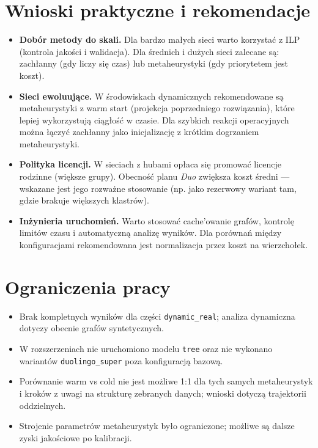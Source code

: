 \section{Wnioski praktyczne i rekomendacje}
\begin{itemize}
  \item \textbf{Dobór metody do skali.} Dla bardzo małych sieci warto korzystać z ILP (kontrola jakości i walidacja). Dla średnich i dużych sieci zalecane są: zachłanny (gdy liczy się czas) lub metaheurystyki (gdy priorytetem jest koszt).
  \item \textbf{Sieci ewoluujące.} W środowiskach dynamicznych rekomendowane są metaheurystyki z warm start (projekcja poprzedniego rozwiązania), które lepiej wykorzystują ciągłość w czasie. Dla szybkich reakcji operacyjnych można łączyć zachłanny jako inicjalizację z krótkim dogrzaniem metaheurystyki.
  \item \textbf{Polityka licencji.} W sieciach z hubami opłaca się promować licencje rodzinne (większe grupy). Obecność planu \emph{Duo} zwiększa koszt średni — wskazane jest jego rozważne stosowanie (np. jako rezerwowy wariant tam, gdzie brakuje większych klastrów).
  \item \textbf{Inżynieria uruchomień.} Warto stosować cache’owanie grafów, kontrolę limitów czasu i automatyczną analizę wyników. Dla porównań między konfiguracjami rekomendowana jest normalizacja przez koszt na wierzchołek.
\end{itemize}

\section{Ograniczenia pracy}
\begin{itemize}
  \item Brak kompletnych wyników dla części \texttt{dynamic\_real}; analiza dynamiczna dotyczy obecnie grafów syntetycznych.
  \item W rozszerzeniach nie uruchomiono modelu \texttt{tree} oraz nie wykonano wariantów \texttt{duolingo\_super} poza konfiguracją bazową.
  \item Porównanie warm vs cold nie jest możliwe 1:1 dla tych samych metaheurystyk i kroków z uwagi na strukturę zebranych danych; wnioski dotyczą trajektorii oddzielnych.
  \item Strojenie parametrów metaheurystyk było ograniczone; możliwe są dalsze zyski jakościowe po kalibracji.
\end{itemize}

